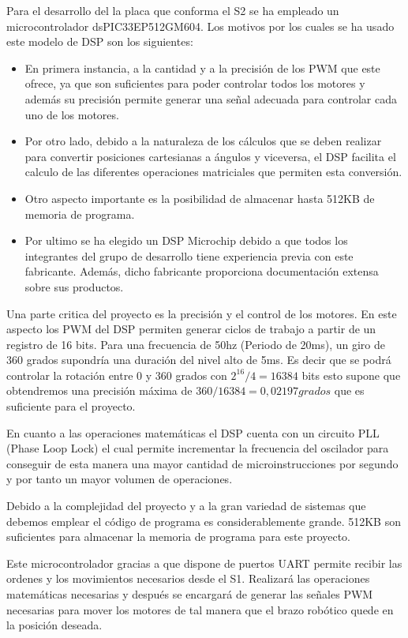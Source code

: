 Para el desarrollo del la placa que conforma el S2 se ha empleado un microcontrolador dsPIC33EP512GM604.
Los motivos por los cuales se ha usado este modelo de DSP son los siguientes: 

\begin{itemize}
\item En primera instancia, a la cantidad y a la precisión de los PWM que este ofrece, ya que son suficientes para poder controlar todos los motores y además su precisión permite generar una señal adecuada para controlar cada uno de los motores.

\item Por otro lado, debido a la naturaleza de los cálculos que se deben realizar para convertir posiciones cartesianas a ángulos y viceversa, el DSP facilita el calculo de las diferentes operaciones matriciales que permiten esta conversión.

\item Otro aspecto importante es la posibilidad de almacenar hasta 512KB de memoria de programa.

\item Por ultimo se ha elegido un DSP Microchip debido a que todos los integrantes del grupo de desarrollo tiene experiencia previa con este fabricante. Además, dicho fabricante proporciona documentación extensa sobre sus productos.

\end{itemize}

Una parte critica del proyecto es la precisión y el control de los motores. En este aspecto los PWM del DSP permiten generar ciclos de trabajo a partir de un registro de 16 bits. Para una frecuencia de 50hz (Periodo de 20ms), un giro de 360 grados supondría una duración del nivel alto de 5ms. Es decir que se podrá controlar la rotación entre 0 y 360 grados con $ 2^{16}/4 = 16384$ bits esto supone que obtendremos una precisión máxima de $360/16384 = 0,02197 grados$ que es suficiente para el proyecto.

En cuanto a las operaciones matemáticas el DSP cuenta con un circuito PLL (Phase Loop Lock) el cual permite incrementar la frecuencia del oscilador para conseguir de esta manera una mayor cantidad de microinstrucciones por segundo y por tanto un mayor volumen de operaciones.

Debido a la complejidad del proyecto y a la gran variedad de sistemas que debemos emplear el código de programa es considerablemente grande. 512KB son suficientes para almacenar la memoria de programa para este proyecto.

Este microcontrolador gracias a que dispone de puertos UART permite recibir las ordenes y los movimientos necesarios desde el S1. Realizará las operaciones matemáticas necesarias y después se encargará de generar las señales PWM necesarias para mover los motores de tal manera que el brazo robótico quede en la posición deseada.





    
